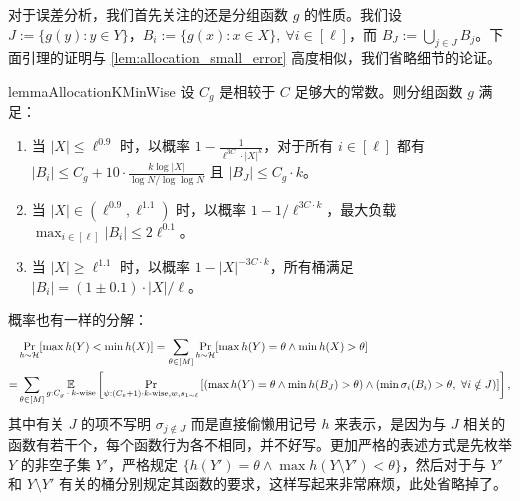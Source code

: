 对于误差分析，我们首先关注的还是分组函数 $g$ 的性质。我们设 $J := \{g(y) : y \in Y\}$，$B_i := \{g(x) : x \in X\},\ \forall i \in [\ell]$，而 $B_J := \bigcup_{j \in J} B_j$。下面引理的证明与 \cref{lem:allocation_small_error} 高度相似，我们省略细节的论证。

\begin{restatable}{lemma}{AllocationKMinWise}\label{lem:allocation_k_min_wise}
    设 $C_g$ 是相较于 $C$ 足够大的常数。则分组函数 $g$ 满足：
    \begin{enumerate}
        \item 当 $|X| \le \ell^{0.9}$ 时，以概率 $1 - \frac{1}{\ell^{3 C} \cdot |X|^{k}}$，对于所有 $i \in [\ell]$ 都有 $|B_i| \le C_g + 10 \cdot \frac{k \log |X|}{\log N / \log \log N}$ 且 $|B_J| \le C_g \cdot k$。
        
        \item 当 $|X| \in (\ell^{0.9}, \ell^{1.1})$ 时，以概率 $1 - 1 / \ell^{3 C \cdot k}$，最大负载 $\max_{i \in [\ell]} |B_i| \le 2 \ell^{0.1}$。
        
        \item 当 $|X| \ge \ell^{1.1}$ 时，以概率 $1-|X|^{-3 C \cdot k}$，所有桶满足 $|B_i| = (1 \pm 0.1) \cdot |X| / \ell$。
    \end{enumerate}
\end{restatable}

概率也有一样的分解：
\begin{align*}
      & \Pr_{h \sim \mathcal{H}}[\max h(Y) < \min h(X)] = \sum_{\theta \in [M]} \Pr_{h \sim \mathcal{H}}[\max h(Y) = \theta \wedge \min h(X) > \theta] \\
    = & \sum_{\theta \in [M]} \operatorname*{\mathbb{E}}_{g : \text{$C_g \cdot k$-wise}} \left[\Pr_{\psi : (C_e + 1) \cdot k\text{-wise}, w, s_{1 \sim \ell}} \left[ (\max h(Y) = \theta \wedge \min h(B_J) > \theta) \wedge (\min \sigma_i(B_i) > \theta,\ \forall i \notin J)  \right]  \right],
\end{align*}
其中有关 $J$ 的项不写明 $\sigma_{j \notin J}$ 而是直接偷懒用记号 $h$ 来表示，是因为与 $J$ 相关的函数有若干个，每个函数行为各不相同，并不好写。更加严格的表述方式是先枚举 $Y$ 的非空子集 $Y'$，严格规定 $\{h(Y') = \theta \wedge \max h(Y \setminus Y') < \theta\}$，然后对于与 $Y'$ 和 $Y \setminus Y'$ 有关的桶分别规定其函数的要求，这样写起来非常麻烦，此处省略掉了。 

